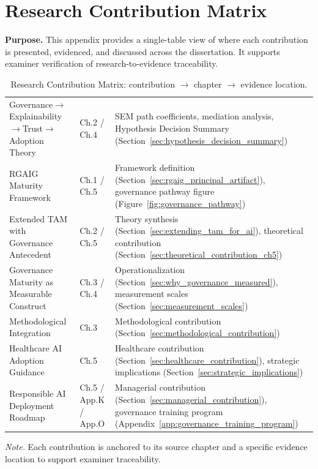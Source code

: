 \chapter{Research Contribution Matrix}
\label{app:contribution_matrix}

\noindent\textbf{Purpose.} This appendix provides a single-table view of where each contribution is presented, evidenced, and discussed across the dissertation. It supports examiner verification of research-to-evidence traceability.

{\tablestripes\tablefontsize
{}
\begin{xltabular}{\textwidth}{@{} >{\raggedright\arraybackslash}p{4cm} >{\raggedright\arraybackslash}p{2.5cm} L @{}}
\caption[Research Contribution Matrix]{Research Contribution Matrix: contribution $\rightarrow$ chapter $\rightarrow$ evidence location.}\label{tab:contribution_matrix} \\
\toprule
{} &  &  \\
\midrule
\endfirsthead
\endhead
\bottomrule
\endlastfoot
Governance$\rightarrow$Explainability$\rightarrow$Trust$\rightarrow$Adoption Theory & Ch.2 / Ch.4 & SEM path coefficients, mediation analysis, Hypothesis Decision Summary (Section~\ref{sec:hypothesis_decision_summary}) \\
\addlinespace
RGAIG Maturity Framework & Ch.1 / Ch.5 & Framework definition (Section~\ref{sec:rgaig_principal_artifact}), governance pathway figure (Figure~\ref{fig:governance_pathway}) \\
\addlinespace
Extended TAM with Governance Antecedent & Ch.2 / Ch.5 & Theory synthesis (Section~\ref{sec:extending_tam_for_ai}), theoretical contribution (Section~\ref{sec:theoretical_contribution_ch5}) \\
\addlinespace
Governance Maturity as Measurable Construct & Ch.3 / Ch.4 & Operationalization (Section~\ref{sec:why_governance_measured}), measurement scales (Section~\ref{sec:measurement_scales}) \\
\addlinespace
Methodological Integration & Ch.3 & Methodological contribution (Section~\ref{sec:methodological_contribution}) \\
\addlinespace
Healthcare AI Adoption Guidance & Ch.5 & Healthcare contribution (Section~\ref{sec:healthcare_contribution}), strategic implications (Section~\ref{sec:strategic_implications}) \\
\addlinespace
Responsible AI Deployment Roadmap & Ch.5 / App.K / App.O & Managerial contribution (Section~\ref{sec:managerial_contribution}), governance training program (Appendix~\ref{app:governance_training_program}) \\
\end{xltabular}}
\vspace{0.3em}\noindent\textit{Note.} Each contribution is anchored to its source chapter and a specific evidence location to support examiner traceability.
